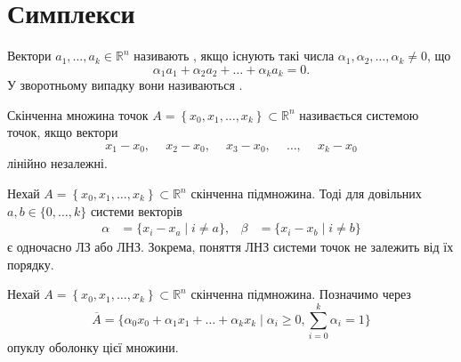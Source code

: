 \section{Симплекси}

\begin{definition}
Вектори $a_{1}, \ldots, a_{k} \in \mathbb{R}^n$ називають , якщо існують такі числа $\alpha_{1}, \alpha_{2}, \ldots, \alpha_{k} \neq 0$, що
\[ \alpha_{1}a_{1}+\alpha_{2}a_{2}+\ldots+\alpha_{k} a_{k}=0. \]
У зворотньому випадку вони називаються .
\end{definition}


\begin{definition}
Скінченна множина точок $A=\left\{x_{0}, x_{1}, \ldots, x_{k}\right\} \subset \mathbb{R}^{n}$ називається  системою точок, якщо вектори
\begin{align*}
    x_{1} - x_{0}, \ \quad
    x_{2} - x_{0}, \ \quad
    x_{3} - x_{0}, \ \quad
    \ldots,        \ \quad
    x_{k} - x_{0}
\end{align*}
лінійно незалежні.
\end{definition}

\begin{lemma}
Нехай $A=\left\{x_{0}, x_{1}, \ldots, x_{k}\right\} \subset \mathbb{R}^{n}$ скінченна підмножина.
Тоді для довільних $a,b\in \{0,\ldots,k\}$ системи векторів
\begin{align*}
    \alpha &= \{ x_{i} - x_{a} \mid i \not= a\}, &
    \beta  &= \{ x_{i} - x_{b} \mid i \not= b\}
\end{align*}
є одночасно ЛЗ або ЛНЗ.
Зокрема, поняття ЛНЗ системи точок не залежить від їх порядку.
\end{lemma}


\newcommand\conv[1]{\overline{#1}}
\newcommand\st[2]{\mathrm{st}_{#2}(#1)}

Нехай $A=\left\{x_{0}, x_{1}, \ldots, x_{k}\right\} \subset \mathbb{R}^{n}$ скінченна підмножина.
Позначимо через
\[
   \conv{A} = \{ \alpha_{0} x_{0}+\alpha_{1} x_{1}+\ldots+\alpha_{k} x_{k} \mid \alpha_i \geq0, \sum_{i=0}^{k}\alpha_i = 1 \}
\]
опуклу оболонку цієї множини.

